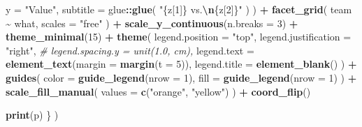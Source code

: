 \documentclass[
]{article}
\newenvironment{Shaded}{\begin{snugshade}}{\end{snugshade}}
\newcommand{\AttributeTok}[1]{\textcolor[rgb]{0.13,0.29,0.53}{#1}}
\newcommand{\CommentTok}[1]{\textcolor[rgb]{0.56,0.35,0.01}{\textit{#1}}}
\newcommand{\DecValTok}[1]{\textcolor[rgb]{0.00,0.00,0.81}{#1}}
\newcommand{\FunctionTok}[1]{\textcolor[rgb]{0.13,0.29,0.53}{\textbf{#1}}}
\newcommand{\NormalTok}[1]{#1}
\newcommand{\SpecialCharTok}[1]{\textcolor[rgb]{0.81,0.36,0.00}{\textbf{#1}}}
\newcommand{\StringTok}[1]{\textcolor[rgb]{0.31,0.60,0.02}{#1}}
\begin{document}
\begin{Shaded}
\begin{Highlighting}[]
        \AttributeTok{y =} \StringTok{"Value"}\NormalTok{,}
        \AttributeTok{subtitle =}\NormalTok{ glue}\SpecialCharTok{::}\FunctionTok{glue}\NormalTok{(}
          \StringTok{"\{z[1]\} vs.}\SpecialCharTok{\textbackslash{}n}\StringTok{\{z[2]\}"}
\NormalTok{        )}
\NormalTok{      ) }\SpecialCharTok{+}
      \FunctionTok{facet\_grid}\NormalTok{(}
\NormalTok{        team }\SpecialCharTok{\textasciitilde{}}\NormalTok{ what,}
        \AttributeTok{scales =} \StringTok{"free"}
\NormalTok{      ) }\SpecialCharTok{+}
      \FunctionTok{scale\_y\_continuous}\NormalTok{(}\AttributeTok{n.breaks =} \DecValTok{3}\NormalTok{) }\SpecialCharTok{+}
      \FunctionTok{theme\_minimal}\NormalTok{(}\DecValTok{15}\NormalTok{) }\SpecialCharTok{+}
      \FunctionTok{theme}\NormalTok{(}
        \AttributeTok{legend.position =} \StringTok{"top"}\NormalTok{,}
        \AttributeTok{legend.justification =} \StringTok{"right"}\NormalTok{,}
        \CommentTok{\# legend.spacing.y = unit(1.0, \textquotesingle{}cm\textquotesingle{}),}
        \AttributeTok{legend.text =} \FunctionTok{element\_text}\NormalTok{(}\AttributeTok{margin =} \FunctionTok{margin}\NormalTok{(}\AttributeTok{t =} \DecValTok{5}\NormalTok{)),}
        \AttributeTok{legend.title =} \FunctionTok{element\_blank}\NormalTok{()}
\NormalTok{      ) }\SpecialCharTok{+}
      \FunctionTok{guides}\NormalTok{(}
        \AttributeTok{color =} \FunctionTok{guide\_legend}\NormalTok{(}\AttributeTok{nrow =} \DecValTok{1}\NormalTok{),}
        \AttributeTok{fill =} \FunctionTok{guide\_legend}\NormalTok{(}\AttributeTok{nrow =} \DecValTok{1}\NormalTok{)}
\NormalTok{      ) }\SpecialCharTok{+}
      \FunctionTok{scale\_fill\_manual}\NormalTok{(}
        \AttributeTok{values =} \FunctionTok{c}\NormalTok{(}\StringTok{"orange"}\NormalTok{, }\StringTok{"yellow"}\NormalTok{)}
\NormalTok{      ) }\SpecialCharTok{+}
      \FunctionTok{coord\_flip}\NormalTok{()}

    \FunctionTok{print}\NormalTok{(p)}
\NormalTok{  \}}
\NormalTok{)}
\end{Highlighting}
\end{Shaded}
\end{document}
